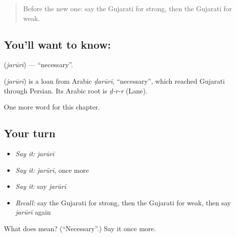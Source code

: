 \label{lesson:GU-C137-jaruri}



\begin{quote}
Before the new one: say the Gujarati for strong, then the Gujarati for weak.
\end{quote}

\subsection*{You'll want to know: }
\textbf{} (\emph{jarūrī}) — \textquotedblleft{}necessary\textquotedblright{}.

\begin{cousinweb}
\textbf{} (\emph{jarūrī}) is a loan from Arabic \emph{ḍarūrī}, \textquotedblleft{}necessary\textquotedblright{}, which reached Gujarati through Persian. Its Arabic root is \emph{ḍ-r-r} (Lane).
\end{cousinweb}

\begin{grammarlens}[title={What you've built}]
One more word for this chapter.
\end{grammarlens}

\subsection*{Your turn}
\begin{itemize}
\raggedright
  \item \emph{Say it:} \emph{jarūrī}
  \item \emph{Say it:} \emph{jarūrī}, once more
  \item \emph{Say it:} say \emph{jarūrī}
  \item \emph{Recall:} say the Gujarati for strong, then the Gujarati for weak, then say \emph{jarūrī} again
\end{itemize}

\begin{tcolorbox}[breakable,colback=teal!4,colframe=teal!35!black,title={Before you move on}]
What does  mean? (\textquotedblleft{}Necessary\textquotedblright{}.) Say it once more.
\end{tcolorbox}
